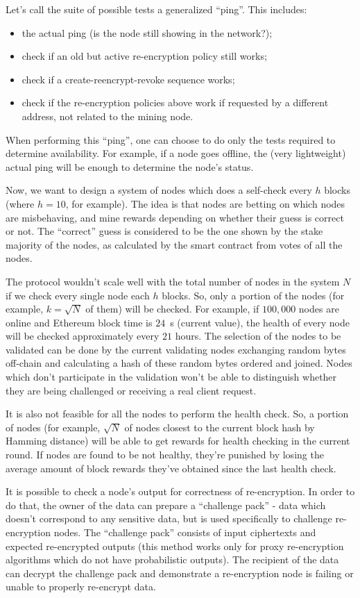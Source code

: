 \documentclass[longbibliography,nofootinbib]{revtex4-1}
\begin{document}
\begin{CJK*}{UTF8}{gbsn}
Let's call the suite of possible tests a generalized ``ping''.
This includes:
\begin{itemize}
    \item the actual ping (is the node still showing in the network?);
    \item check if an old but active re-encryption policy still works;
    \item check if a create-reencrypt-revoke sequence works;
    \item check if the re-encryption policies above work if requested by a different address, not related to the mining node.
\end{itemize}
When performing this ``ping'', one can choose to do only the tests required to determine availability.
For example, if a node goes offline, the (very lightweight) actual ping will be enough to determine the node's status.

Now, we want to design a system of nodes which does a self-check every $h$ blocks (where $h=10$, for example).
The idea is that nodes are betting on which nodes are misbehaving, and mine rewards depending on whether their guess is correct or not.
The ``correct'' guess is considered to be the one shown by the stake majority of the nodes, as calculated by the smart contract from votes of all the nodes.

The protocol wouldn't scale well with the total number of nodes in the system $N$ if we check every single node each $h$ blocks.
So, only a portion of the nodes (for example, $k=\sqrt{N}$ of them) will be checked.
For example, if $100,000$ nodes are online and Ethereum block time is $24$~s (current value), the health of every node will be checked approximately every $21$
hours.
The selection of the nodes to be validated can be done by the current validating nodes exchanging random bytes off-chain and calculating a hash of these
random bytes ordered and joined.
Nodes which don't participate in the validation won't be able to distinguish whether they are being challenged or receiving a real client request.

It is also not feasible for all the nodes to perform the health check.
So, a portion of nodes (for example, $\sqrt{N}$ of nodes closest to the current block hash by Hamming distance) will be able to get rewards for health checking
in the current round.
If nodes are found to be not healthy, they're punished by losing the average amount of block rewards they've obtained since the last health check.

It is possible to check a node's output for correctness of re-encryption.
In order to do that, the owner of the data can prepare a ``challenge pack'' - data which doesn't correspond to any sensitive data, but is used specifically to
challenge re-encryption nodes.
The ``challenge pack'' consists of input ciphertexts and expected re-encrypted outputs
(this method works only for proxy re-encryption algorithms which do not have probabilistic outputs).
The recipient of the data can decrypt the challenge pack and demonstrate a re-encryption node is failing or unable to properly re-encrypt data.


\end{CJK*}
\end{document}
